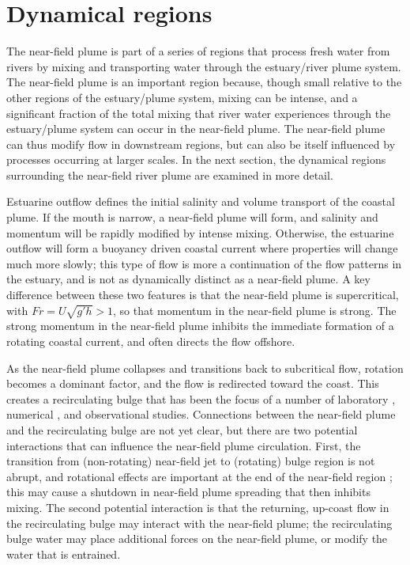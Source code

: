 \documentclass[12pt]{article}
\begin{document}
{\section{Dynamical regions}

The near-field plume is part of a series of regions that process fresh water from rivers by mixing and transporting water through the estuary/river plume system. The near-field plume is an important region because, though small relative to the other regions of the estuary/plume system, mixing can be intense, and a significant fraction of the total mixing that river water experiences through the estuary/plume system can occur in the near-field plume. The near-field plume can thus modify flow in downstream regions, but can also be itself influenced by processes occurring at larger scales. In the next section, the dynamical regions surrounding the near-field river plume are examined in more detail. 

Estuarine outflow defines the initial salinity and volume transport of the coastal plume.  If the mouth is narrow, a near-field plume will form, and salinity and momentum will be rapidly modified by intense mixing. Otherwise, the estuarine outflow will form a buoyancy driven coastal current where properties will change much more slowly; this type of flow is more a continuation of the flow patterns in the estuary, and is not as dynamically distinct as a near-field plume. A key difference between these two features is that the near-field plume is supercritical, with $Fr = U \sqrt{g' h} > 1$, so that momentum in the near-field plume is strong. The strong momentum in the near-field plume inhibits the immediate formation of a rotating coastal current, and often directs the flow offshore. 

As the near-field plume collapses and transitions back to subcritical flow, rotation becomes a dominant factor, and the flow is redirected toward the coast. This creates a recirculating bulge that has been the focus of a number of laboratory \citep{avicola.huq:03b,horner-devine.ea:06}, numerical \citep{fong.geyer:02,isobe:05}, and observational \citep{horner-devine:09,kudela.ea:10} studies. Connections between the near-field plume and the recirculating bulge are not yet clear, but there are two potential interactions that can influence the near-field plume circulation. First, the transition from (non-rotating) near-field jet to (rotating) bulge region is not abrupt, and rotational effects are important at the end of the near-field region \citep{cole.dissertation}; this may cause a shutdown in near-field plume spreading that then inhibits mixing. The second potential interaction is that the returning, up-coast flow in the recirculating bulge may interact with the near-field plume; the recirculating bulge water may place additional forces on the near-field plume, or modify the water that is entrained.

}
\end{document}
